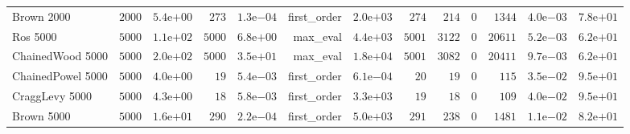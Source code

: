 \begin{longtable}[c]{lrrrrrrrrrrrr}
Brown 2000 & \( 2000\) & \( 5.4\)e\(+00\) & \(  273\) & \( 1.3\)e\(-04\) & first\_order & \( 2.0\)e\(+03\) & \(  274\) & \(  214\) & \(    0\) & \( 1344\) & \( 4.0\)e\(-03\) & \( 7.8\)e\(+01\) \\
Ros 5000 & \( 5000\) & \( 1.1\)e\(+02\) & \( 5000\) & \( 6.8\)e\(+00\) & max\_eval & \( 4.4\)e\(+03\) & \( 5001\) & \( 3122\) & \(    0\) & \(20611\) & \( 5.2\)e\(-03\) & \( 6.2\)e\(+01\) \\
ChainedWood 5000 & \( 5000\) & \( 2.0\)e\(+02\) & \( 5000\) & \( 3.5\)e\(+01\) & max\_eval & \( 1.8\)e\(+04\) & \( 5001\) & \( 3082\) & \(    0\) & \(20411\) & \( 9.7\)e\(-03\) & \( 6.2\)e\(+01\) \\
ChainedPowel 5000 & \( 5000\) & \( 4.0\)e\(+00\) & \(   19\) & \( 5.4\)e\(-03\) & first\_order & \( 6.1\)e\(-04\) & \(   20\) & \(   19\) & \(    0\) & \(  115\) & \( 3.5\)e\(-02\) & \( 9.5\)e\(+01\) \\
CraggLevy 5000 & \( 5000\) & \( 4.3\)e\(+00\) & \(   18\) & \( 5.8\)e\(-03\) & first\_order & \( 3.3\)e\(+03\) & \(   19\) & \(   18\) & \(    0\) & \(  109\) & \( 4.0\)e\(-02\) & \( 9.5\)e\(+01\) \\
Brown 5000 & \( 5000\) & \( 1.6\)e\(+01\) & \(  290\) & \( 2.2\)e\(-04\) & first\_order & \( 5.0\)e\(+03\) & \(  291\) & \(  238\) & \(    0\) & \( 1481\) & \( 1.1\)e\(-02\) & \( 8.2\)e\(+01\) \\
\hline 
\end{longtable}
